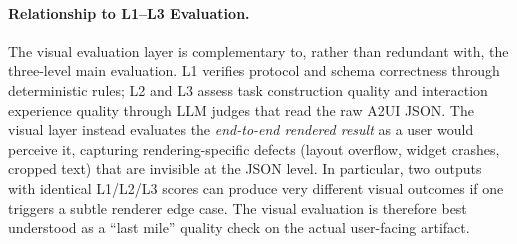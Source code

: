 \paragraph{Relationship to L1--L3 Evaluation.}
The visual evaluation layer is complementary to, rather than redundant with, the three-level main evaluation. L1 verifies protocol and schema correctness through deterministic rules; L2 and L3 assess task construction quality and interaction experience quality through LLM judges that read the raw A2UI JSON. The visual layer instead evaluates the \emph{end-to-end rendered result} as a user would perceive it, capturing rendering-specific defects (layout overflow, widget crashes, cropped text) that are invisible at the JSON level. In particular, two outputs with identical L1/L2/L3 scores can produce very different visual outcomes if one triggers a subtle renderer edge case. The visual evaluation is therefore best understood as a ``last mile'' quality check on the actual user-facing artifact.
